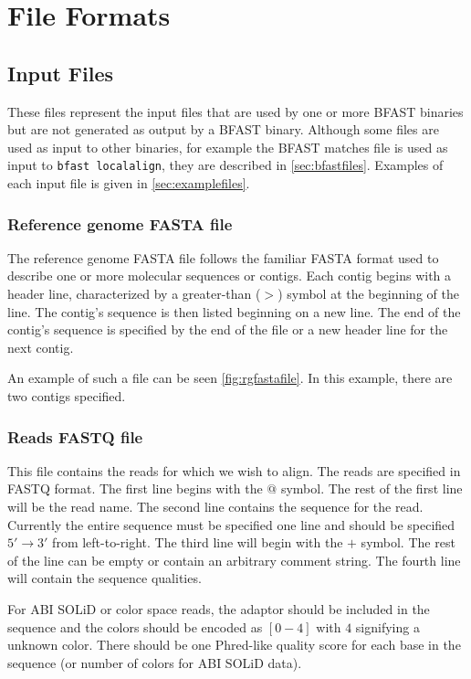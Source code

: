 \documentclass[a4paper,12pt]{book}
\newcommand{\TT}[1]{{\tt #1}} %
\newcommand{\rGFF}{reference genome FASTA file}
\newcommand{\RGFF}{Reference genome FASTA file}
\newcommand{\RFF}{Reads FASTQ file}
\newcommand{\BMF}{BFAST matches file} %
\newcommand{\FIVETOTHREE}{$5'\rightarrow3'$} %
\begin{document}
\chapter{File Formats}
\section{Input Files}
\label{sec:inputfiles}
These files represent the input files that are used by one or more BFAST binaries but are not generated as output by a BFAST binary.
Although some files are used as input to other binaries, for example the \BMF{} is used as input to \TT{bfast localalign}, they are described in \autoref{sec:bfastfiles}.
Examples of each input file is given in \autoref{sec:examplefiles}.
\subsection{\RGFF{}}
\label{sec:rgfastafile}
The \rGFF{} follows the familiar FASTA format used to describe one or more molecular sequences or contigs.
Each contig begins with a header line, characterized by a greater-than ($>$) symbol at the beginning of the line.
The contig's sequence is then listed beginning on a new line.
The end of the contig's sequence is specified by the end of the file or a new header line for the next contig.

An example of such a file can be seen \autoref{fig:rgfastafile}.
In this example, there are two contigs specified. 

\subsection{\RFF{}}
\label{sec:rff}
This file contains the reads for which we wish to align.
The reads are specified in FASTQ format.
The first line begins with the $@$ symbol.
The rest of the first line will be the read name.
The second line contains the sequence for the read.
Currently the entire sequence must be specified one line and should be specified \FIVETOTHREE{} from left-to-right.
The third line will begin with the $+$ symbol.
The rest of the line can be empty or contain an arbitrary comment string.
The fourth line will contain the sequence qualities.

For ABI SOLiD or color space reads, the adaptor should be included in the sequence and the colors should be encoded as $[0-4]$ with $4$ signifying a unknown color.  
There should be one Phred-like quality score for each base in the sequence (or number of colors for ABI SOLiD data).
\end{document}
